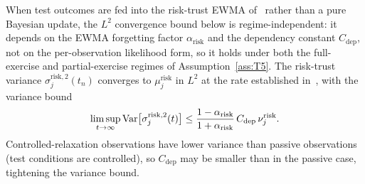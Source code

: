 \begin{corollary}
\label{cor:ewma}
When test outcomes are fed into the risk-trust EWMA
of~\citep[Definition~4]{lasser2026scm} rather than a pure
Bayesian update, the $L^2$ convergence bound below is
regime-independent: it depends on the EWMA forgetting factor
$\alpha_{\mathrm{risk}}$ and the dependency constant
$C_{\mathrm{dep}}$, not on the per-observation likelihood
form, so it holds under both the full-exercise and
partial-exercise regimes of Assumption~\ref{ass:T5}.  The
risk-trust variance $\sigma_j^{\mathrm{risk},2}(t_n)$
converges to $\mu_j^{\mathrm{risk}}$ in $L^2$ at the rate
established in~\citep[Proposition~2]{lasser2026scm}, with the
variance bound
$$
\limsup_{t \to \infty}
  \operatorname{Var}\bigl[\sigma_j^{\mathrm{risk},2}(t)\bigr]
  \leq \frac{1 - \alpha_{\mathrm{risk}}}{1 + \alpha_{\mathrm{risk}}}
       \, C_{\mathrm{dep}} \, \nu_j^{\mathrm{risk}}.
$$
Controlled-relaxation observations have lower variance than
passive observations (test conditions are controlled), so
$C_{\mathrm{dep}}$ may be smaller than in the passive case,
tightening the variance bound.
\end{corollary}
